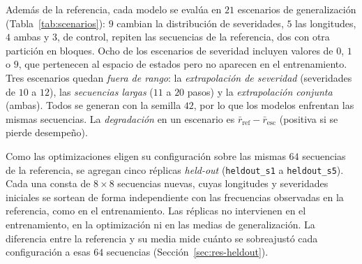 \documentclass[../00_Main/Main.tex]{subfiles}
\begin{document}
Adem\'as de la referencia, cada modelo se eval\'ua
en $21$ escenarios de generalizaci\'on (Tabla~\ref{tab:scenarios}): $9$
cambian la distribuci\'on de severidades, $5$ las longitudes, $4$ ambas
y $3$, de control, repiten las secuencias de la referencia, dos con otra
partici\'on en bloques. Ocho de los escenarios de severidad
incluyen valores de $0$, $1$ o $9$, que pertenecen al espacio de estados
pero no aparecen en el entrenamiento. Tres escenarios quedan \emph{fuera de
rango}: la \emph{extrapolaci\'on de severidad} (severidades de $10$ a
$12$), las \emph{secuencias largas} ($11$ a $20$ pasos) y la
\emph{extrapolaci\'on conjunta} (ambas). Todos se generan con la semilla
$42$, por lo que los modelos enfrentan las mismas secuencias. La
\emph{degradaci\'on} en un escenario es
$\bar r_{\mathrm{ref}} - \bar r_{\mathrm{esc}}$ (positiva si se pierde
desempe\~no).

Como las optimizaciones eligen su configuraci\'on sobre las mismas $64$
secuencias de la referencia, se agregan cinco r\'eplicas \emph{held-out} (\texttt{heldout\_s1} a \texttt{heldout\_s5}). Cada una consta de
$8 \times 8$ secuencias nuevas, cuyas longitudes y severidades iniciales se
sortean de forma independiente con las frecuencias observadas en la
referencia, como en el entrenamiento. Las r\'eplicas no intervienen en el
entrenamiento, en la optimizaci\'on ni en las medias de generalizaci\'on.
La diferencia entre la referencia y su media mide cu\'anto se sobreajust\'o
cada configuraci\'on a esas $64$ secuencias
(Secci\'on~\ref{sec:res-heldout}).
\end{document}
